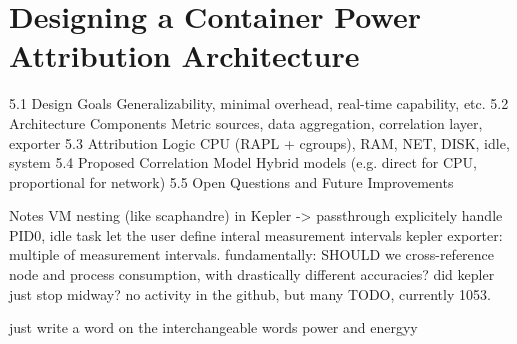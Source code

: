\chapter{Designing a Container Power Attribution Architecture} %
\label{Chapter5}


    5.1 Design Goals
        Generalizability, minimal overhead, real-time capability, etc.
    5.2 Architecture Components
        Metric sources, data aggregation, correlation layer, exporter
    5.3 Attribution Logic
        CPU (RAPL + cgroups), RAM, NET, DISK, idle, system
    5.4 Proposed Correlation Model
        Hybrid models (e.g. direct for CPU, proportional for network)
    5.5 Open Questions and Future Improvements


Notes
    VM nesting (like scaphandre) in Kepler -> passthrough
    explicitely handle PID0, idle task
    let the user define interal measurement intervals
        kepler exporter: multiple of measurement intervals.
    fundamentally: SHOULD we cross-reference node and process consumption, with drastically different accuracies?
    did kepler just stop midway? no activity in the github, but many TODO, currently 1053.


    just write a word on the interchangeable words power and energyy